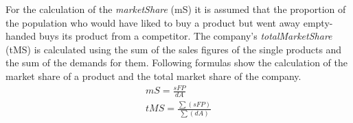 For the calculation of the \textit{marketShare} (\gls{mS}) it is assumed that the proportion of the population who would have liked to buy a product but went away empty-handed buys its product from a competitor. The company's \textit{totalMarketShare} (\gls{tMS}) is calculated using the sum of the sales figures of the single products and the sum of the demands for them. Following formulas show the calculation of the market share of a product and the total market share of the company. 
\begin{equation}
\label{func:marketShare}
\begin{aligned}
mS = \frac{sFP}{dA} \\
tMS = \frac{\sum(sFP)}{\sum(dA)}  
\end{aligned}
\end{equation}

